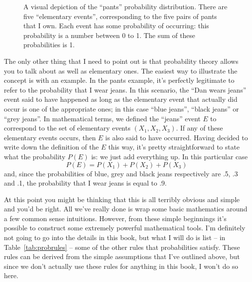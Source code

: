 \begin{figure}
\begin{center}
\caption{A visual depiction of the ``pants'' probability distribution. There are five ``elementary events'', corresponding to the five pairs of pants that I own. Each event has some probability of occurring: this probability is a number between 0 to 1. The sum of these probabilities is 1.}
\label{fig:pantsprob}
\HR
\end{center}
\end{figure}



The only other thing that I need to point out is that probability theory allows you to talk about  as well as elementary ones. The easiest way to illustrate the concept is with an example. In the pants example, it's perfectly legitimate to refer to the probability that I wear jeans. In this scenario, the ``Dan wears jeans'' event said to have happened as long as the elementary event that actually did occur is one of the appropriate ones; in this case ``blue jeans'', ``black jeans'' or ``grey jeans''. In mathematical terms, we defined the ``jeans'' event $E$ to correspond to the set of elementary events $(X_1, X_2, X_3)$. If any of these elementary events occurs, then $E$ is also said to have occurred. Having decided to write down the definition of the $E$ this way, it's pretty straightforward to state what the probability $P(E)$ is: we just add everything up. In this particular case
$$
P(E) = P(X_1) + P(X_2) + P(X_3)
$$ 
and, since the probabilities of blue, grey and black jeans respectively are .5, .3 and .1, the probability that I wear jeans is equal to .9. 

At this point you might be thinking that this is all terribly obvious and simple and you'd be right. All we've really done is wrap some basic mathematics around a few common sense intuitions. However, from these simple beginnings it's possible to construct some extremely powerful mathematical tools. I'm definitely not going to go into the details in this book, but what I will do is list -- in  Table~\ref{tab:probrules} -- some of the other rules that probabilities satisfy. These rules can be derived from the simple assumptions that I've outlined above, but since we don't actually use these rules for anything in this book, I won't do so here.

